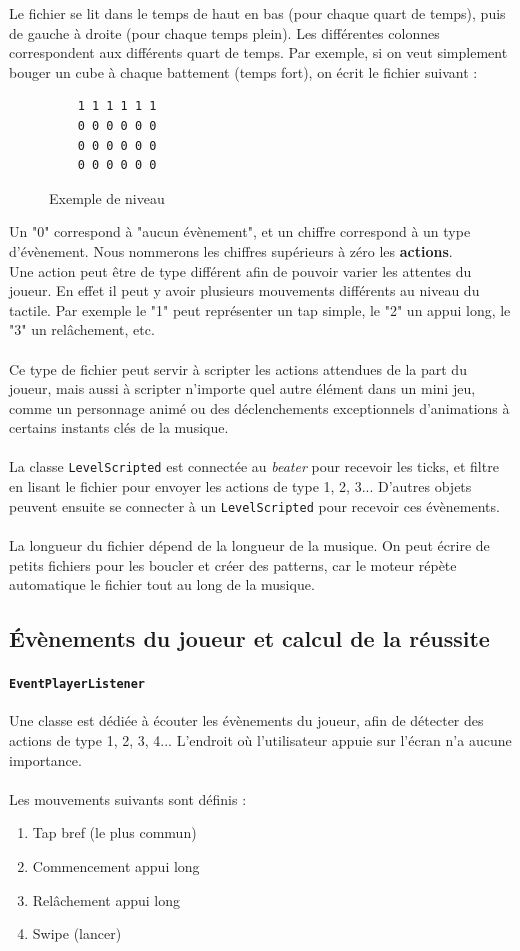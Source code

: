 Le fichier se lit dans le temps de haut en bas (pour chaque quart de temps), puis de gauche à droite (pour chaque temps plein). Les différentes colonnes correspondent aux différents quart de temps. Par exemple, si on veut simplement bouger un cube à chaque battement (temps fort), on écrit le fichier suivant :\\
\begin{figure}[!htb]
  \begin{lstlisting}
    1 1 1 1 1 1
    0 0 0 0 0 0
    0 0 0 0 0 0
    0 0 0 0 0 0
  \end{lstlisting}
\caption{Exemple de niveau}
\label{simple_level}
\end{figure}
Un "0" correspond à "aucun évènement", et un chiffre correspond à un type d'évènement. Nous nommerons les chiffres supérieurs à zéro les \textbf{actions}.
\\
Une action peut être de type différent afin de pouvoir varier les attentes du joueur. En effet il peut y avoir plusieurs mouvements différents au niveau du tactile. Par exemple le "1" peut représenter un tap simple, le "2" un appui long, le "3" un relâchement, etc.
\\\\
Ce type de fichier peut servir à scripter les actions attendues de la part du joueur, mais aussi à scripter n'importe quel autre élément dans un mini jeu, comme un personnage animé ou des déclenchements exceptionnels d'animations à certains instants clés de la musique.
\\\\
La classe \texttt{LevelScripted} est connectée au \textit{beater} pour recevoir les ticks, et filtre en lisant le fichier pour envoyer les actions de type 1, 2, 3... D'autres objets peuvent ensuite se connecter à un \texttt{LevelScripted} pour recevoir ces évènements.
\\\\
La longueur du fichier dépend de la longueur de la musique. On peut écrire de petits fichiers pour les boucler et créer des patterns, car le moteur répète automatique le fichier tout au long de la musique.

\subsection{Évènements du joueur et calcul de la réussite}
\paragraph{\texttt{EventPlayerListener}}
Une classe est dédiée à écouter les évènements du joueur, afin de détecter des actions de type 1, 2, 3, 4... L'endroit où l'utilisateur appuie sur l'écran n'a aucune importance.\\\\
Les mouvements suivants sont définis :
\begin{enumerate}
\item Tap bref (le plus commun)
\item Commencement appui long
\item Relâchement appui long
\item Swipe (lancer)
\end{enumerate}


